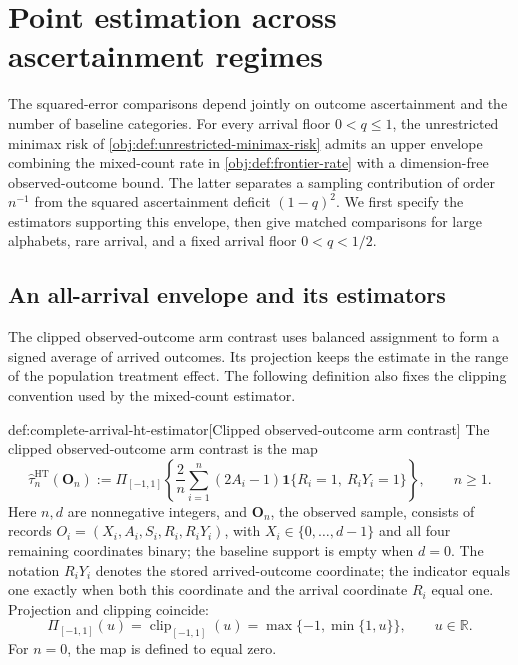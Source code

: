 \section{Point estimation across ascertainment regimes}

The squared-error comparisons depend jointly on outcome ascertainment and the number of baseline categories. For every arrival floor \(0<q\le1\), the unrestricted minimax risk  of \cref{obj:def:unrestricted-minimax-risk} admits an upper envelope combining the mixed-count rate in \cref{obj:def:frontier-rate} with a dimension-free observed-outcome bound. The latter separates a sampling contribution of order \(n^{-1}\) from the squared ascertainment deficit \((1-q)^2\). We first specify the estimators supporting this envelope, then give matched comparisons for large alphabets, rare arrival, and a fixed arrival floor \(0<q<1/2\).

\subsection{An all-arrival envelope and its estimators}

The clipped observed-outcome arm contrast  uses balanced assignment to form a signed average of arrived outcomes. Its projection  keeps the estimate in the range of the population treatment effect. The following definition also fixes the clipping convention used by the mixed-count estimator.

\begin{definitionv}{def:complete-arrival-ht-estimator}[Clipped observed-outcome arm contrast]
The clipped observed-outcome arm contrast is the map
\[
\widehat\tau^{\mathrm{HT}}_n(\mathbf O_n)
:=
\Pi_{[-1,1]}\!\left\{
\frac{2}{n}\sum_{i=1}^n
(2A_i-1)\mathbf{1}\{R_i=1,\ R_iY_i=1\}
\right\},
\qquad n\ge1.
\]
Here \(n,d\) are nonnegative integers, and \(\mathbf O_n\), the observed sample, consists of records
\(O_i=(X_i,A_i,S_i,R_i,R_iY_i)\), with \(X_i\in\{0,\ldots,d-1\}\) and all four remaining coordinates binary; the baseline support is empty when \(d=0\). The notation \(R_iY_i\) denotes the stored arrived-outcome coordinate; the indicator equals one exactly when both this coordinate and the arrival coordinate \(R_i\) equal one. Projection and clipping coincide:
\[
\Pi_{[-1,1]}(u)=\operatorname{clip}_{[-1,1]}(u)
=\max\{-1,\min\{1,u\}\},
\qquad u\in\mathbb R.
\]
For \(n=0\), the map is defined to equal zero.
\end{definitionv}

